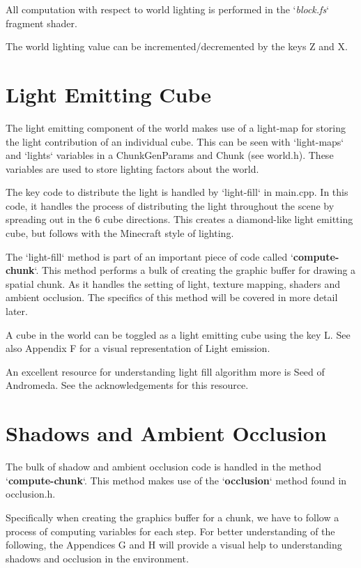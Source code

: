 \documentclass{book}
\begin{document}
All computation with respect to world lighting is performed in the `\textit{block.fs}` fragment shader.  
    
The world lighting value can be incremented/decremented by the keys Z and X.
    
\section{Light Emitting Cube}
The light emitting component of the world makes use of a light-map for storing the light contribution of an individual cube.  This can be seen with `light-maps` and `lights` variables in a ChunkGenParams and Chunk (see world.h).  These variables are used to store lighting factors about the world.
    
The key code to distribute the light is handled by `light-fill` in main.cpp.  In this code, it handles the process of distributing the light throughout the scene by spreading out in the 6 cube directions.  This creates a diamond-like light emitting cube, but follows with the Minecraft style of lighting.
    
The `light-fill` method is part of an important piece of code called `\textbf{compute-chunk}`.  This method performs a bulk of creating the graphic buffer for drawing a spatial chunk.  As it handles the setting of light, texture mapping, shaders and ambient occlusion.  The specifics of this method will be covered in more detail later.
    
A cube in the world can be toggled as a light emitting cube using the key L. See also Appendix F for a visual representation of Light emission.
    
An excellent resource for understanding light fill algorithm more is Seed of Andromeda.  See the acknowledgements for this resource. 
    
\section{Shadows and Ambient Occlusion}
    
The bulk of shadow and ambient occlusion code is handled in the method `\textbf{compute-chunk}`. This method makes use of the `\textbf{occlusion}` method found in occlusion.h.  
    
Specifically when creating the graphics buffer for a chunk, we have to follow a process of computing variables for each step.  For better understanding of the following, the Appendices G and H will provide a visual help to understanding shadows and occlusion in the environment.
    
\end{document}
